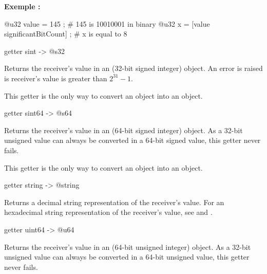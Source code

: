 {\textbf{Exemple :}
\begin{galgas4}
@u32 value = 145 ; # 145 is 10010001 in binary
@u32 x = [value significantBitCount] ; # x is equal to 8
\end{galgas4}







\begin{galgas4}
getter sint -> @s32
\end{galgas4}

Returns the receiver's value in an  (32-bit signed integer) object. An error is raised is receiver's value is greater than $2^{31}-1$.

This getter is the only way to convert an  object into an  object.





\begin{galgas4}
getter sint64 -> @s64
\end{galgas4}

Returns the receiver's value in an  (64-bit signed integer) object. As a 32-bit unsigned value can always be converted in a 64-bit signed value, this getter never fails.

This getter is the only way to convert an  object into an  object.



\begin{galgas4}
getter string -> @string
\end{galgas4}

Returns a decimal string representation of the receiver's value. For an hexadecimal string representation of the receiver's value, see  and .





\begin{galgas4}
getter uint64 -> @u64
\end{galgas4}

Returns the receiver's value in an  (64-bit unsigned integer) object. As a 32-bit unsigned value can always be converted in a 64-bit unsigned value, this getter never fails.

}
